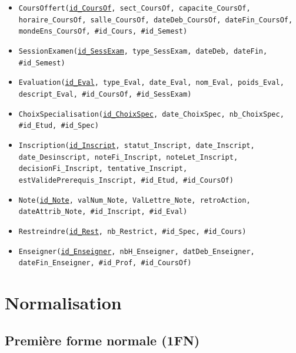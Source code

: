\documentclass[11pt,a4paper]{article}
\begin{document}
\begin{itemize}
    \item \texttt{CoursOffert(\underline{id\_CoursOf}, sect\_CoursOf,
        capacite\_CoursOf, horaire\_CoursOf, salle\_CoursOf,
        dateDeb\_CoursOf, dateFin\_CoursOf, mondeEns\_CoursOf,
        \#id\_Cours, \#id\_Semest)}

    \item \texttt{SessionExamen(\underline{id\_SessExam}, type\_SessExam,
        dateDeb, dateFin, \#id\_Semest)}

    \item \texttt{Evaluation(\underline{id\_Eval}, type\_Eval, date\_Eval,
        nom\_Eval, poids\_Eval, descript\_Eval, \#id\_CoursOf,
        \#id\_SessExam)}

    \item \texttt{ChoixSpecialisation(\underline{id\_ChoixSpec},
        date\_ChoixSpec, nb\_ChoixSpec, \#id\_Etud, \#id\_Spec)}

    \item \texttt{Inscription(\underline{id\_Inscript}, statut\_Inscript,
        date\_Inscript, date\_Desinscript, noteFi\_Inscript,
        noteLet\_Inscript, decisionFi\_Inscript, tentative\_Inscript,
        estValidePrerequis\_Inscript, \#id\_Etud, \#id\_CoursOf)}

    \item \texttt{Note(\underline{id\_Note}, valNum\_Note, ValLettre\_Note,
        retroAction, dateAttrib\_Note, \#id\_Inscript, \#id\_Eval)}

    \item \texttt{Restreindre(\underline{id\_Rest}, nb\_Restrict,
        \#id\_Spec, \#id\_Cours)}

    \item \texttt{Enseigner(\underline{id\_Enseigner}, nbH\_Enseigner,
        datDeb\_Enseigner, dateFin\_Enseigner, \#id\_Prof,
        \#id\_CoursOf)}
\end{itemize}


\section{Normalisation}

\subsection{Première forme normale (1FN)}
\end{document}
